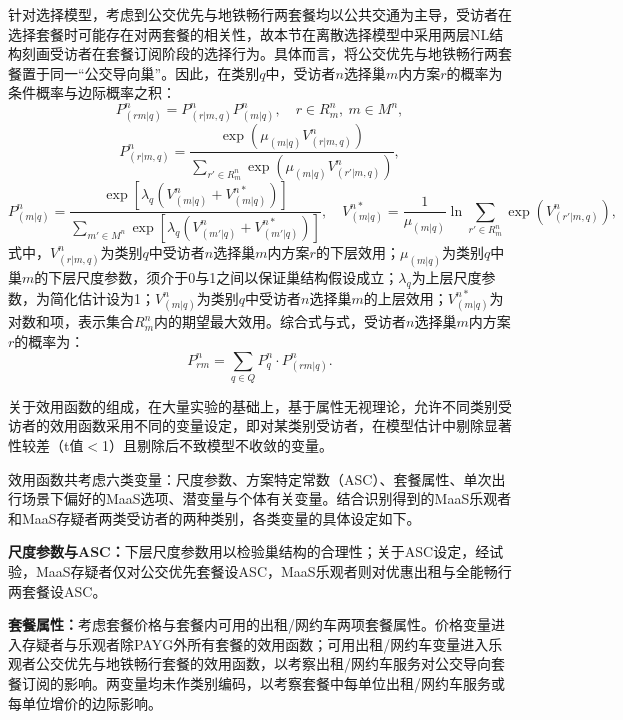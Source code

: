 针对选择模型，考虑到公交优先与地铁畅行两套餐均以公共交通为主导，受访者在选择套餐时可能存在对两套餐的相关性，故本节在离散选择模型中采用两层NL结构刻画受访者在套餐订阅阶段的选择行为。具体而言，将公交优先与地铁畅行两套餐置于同一``公交导向巢''。因此，在类别$q$中，受访者$n$选择巢$m$内方案$r$的概率为条件概率与边际概率之积：
\begin{equation}
P_{(rm|q)}^n = P_{(r|m,q)}^n P_{(m|q)}^n,\quad r\in R_m^n,\ m\in M^n,
\label{eq.staged.bundle.nl}
\end{equation}
\begin{equation}
P_{(r|m,q)}^n = \frac{\exp(\mu_{(m|q)} V_{(r|m,q)}^n)}{\sum_{r'\in R_m^n}\exp(\mu_{(m|q)} V_{(r'|m,q)}^n)},
\label{eq.staged.bundle.cond}
\end{equation}
\begin{equation}
P_{(m|q)}^n = \frac{\exp[\lambda_q (V_{(m|q)}^n+V_{(m|q)}^{n*})]}{\sum_{m'\in M^n}\exp[\lambda_q (V_{(m'|q)}^n+V_{(m'|q)}^{n*})]},\quad V_{(m|q)}^{n*} = \frac{1}{\mu_{(m|q)}}\ln\!\sum_{r'\in R_m^n}\exp(V_{(r'|m,q)}^n),
\label{eq.staged.bundle.marg}
\end{equation}
式中，$V_{(r|m,q)}^n$为类别$q$中受访者$n$选择巢$m$内方案$r$的下层效用；$\mu_{(m|q)}$为类别$q$中巢$m$的下层尺度参数，须介于0与1之间以保证巢结构假设成立；$\lambda_q$为上层尺度参数，为简化估计设为1\citep{huntAlternativeNestedLogit2000}；$V_{(m|q)}^n$为类别$q$中受访者$n$选择巢$m$的上层效用；$V_{(m|q)}^{n*}$为对数和项，表示集合$R_m^n$内的期望最大效用。综合式与式，受访者$n$选择巢$m$内方案$r$的概率为：
\begin{equation}
P_{rm}^n = \sum_{q\in Q} P_q^n \cdot P_{(rm|q)}^n.
\label{eq.staged.bundle.final}
\end{equation}

关于效用函数的组成，在大量实验的基础上，基于属性无视理论，允许不同类别受访者的效用函数采用不同的变量设定\citep{hensherInferringAttributeNonattendance2012,panModelingEVCharging2019}，即对某类别受访者，在模型估计中剔除显著性较差（t值$<$1）且剔除后不致模型不收敛的变量。

效用函数共考虑六类变量：尺度参数、方案特定常数（ASC）、套餐属性、单次出行场景下偏好的MaaS选项、潜变量与个体有关变量。结合识别得到的MaaS乐观者和MaaS存疑者两类受访者的两种类别，各类变量的具体设定如下。

\textbf{尺度参数与ASC：}下层尺度参数用以检验巢结构的合理性；关于ASC设定，经试验，MaaS存疑者仅对公交优先套餐设ASC，MaaS乐观者则对优惠出租与全能畅行两套餐设ASC。

\textbf{套餐属性：}考虑套餐价格与套餐内可用的出租/网约车两项套餐属性。价格变量进入存疑者与乐观者除PAYG外所有套餐的效用函数；可用出租/网约车变量进入乐观者公交优先与地铁畅行套餐的效用函数，以考察出租/网约车服务对公交导向套餐订阅的影响。两变量均未作类别编码，以考察套餐中每单位出租/网约车服务或每单位增价的边际影响。

